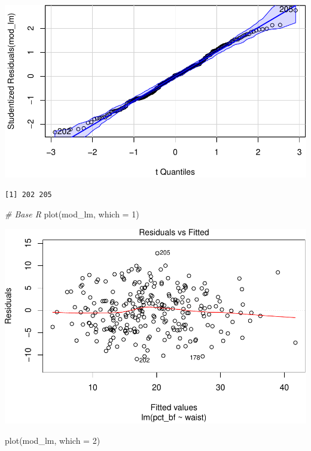 \documentclass[
]{article}
\newenvironment{Shaded}{\begin{snugshade}}{\end{snugshade}}
\newcommand{\AttributeTok}[1]{\textcolor[rgb]{0.77,0.63,0.00}{#1}}
\newcommand{\CommentTok}[1]{\textcolor[rgb]{0.56,0.35,0.01}{\textit{#1}}}
\newcommand{\DecValTok}[1]{\textcolor[rgb]{0.00,0.00,0.81}{#1}}
\newcommand{\FunctionTok}[1]{\textcolor[rgb]{0.00,0.00,0.00}{#1}}
\newcommand{\NormalTok}[1]{#1}
\begin{document}
\begin{center}\includegraphics{CHAP23_files/figure-latex/unnamed-chunk-5-2} \end{center}

\begin{verbatim}
[1] 202 205
\end{verbatim}

\begin{Shaded}
\begin{Highlighting}[]
\CommentTok{\# Base R}
\FunctionTok{plot}\NormalTok{(mod\_lm, }\AttributeTok{which =} \DecValTok{1}\NormalTok{)}
\end{Highlighting}
\end{Shaded}

\begin{center}\includegraphics{CHAP23_files/figure-latex/unnamed-chunk-6-1} \end{center}

\begin{Shaded}
\begin{Highlighting}[]
\FunctionTok{plot}\NormalTok{(mod\_lm, }\AttributeTok{which =} \DecValTok{2}\NormalTok{)}
\end{Highlighting}
\end{Shaded}
\end{document}
